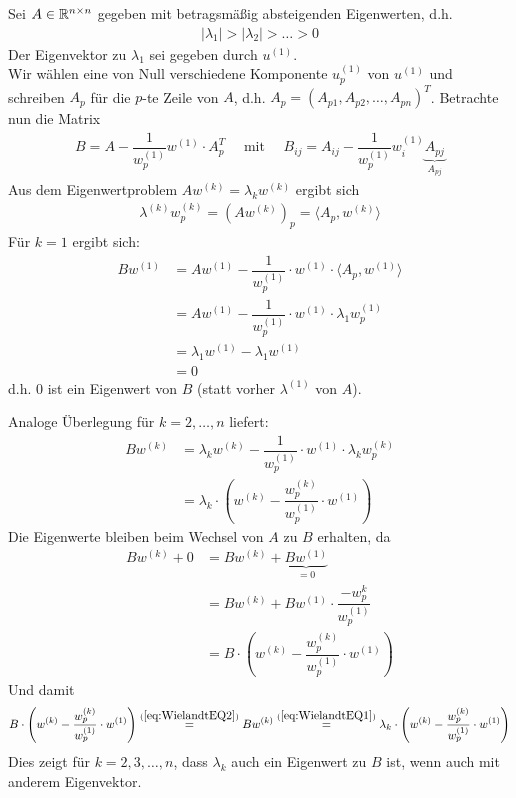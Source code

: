 Sei $A\in\mathbb R^{n\times n}$ gegeben mit betragsmäßig absteigenden Eigenwerten, d.h. 
%
\begin{align*}
  |\lambda_1| > |\lambda_2| > \dots > 0
\end{align*}
%
Der Eigenvektor zu $\lambda_1$ sei gegeben durch $u^{(1)}$. \\
Wir wählen eine von Null verschiedene Komponente $u^{(1)}_p$ von $u^{(1)}$ und schreiben $A_p$ für die $p$-te Zeile
von $A$, d.h. $A_p=(A_{p1},A_{p2},\dots,A_{pn})^T$. Betrachte nun die Matrix 
%
\begin{align*}
  B 
  = A - \dfrac{1}{w_p^{(1)}} w^{(1)}\cdot A_p^T\quad\text{ mit }\quad B_{ij} = 
  A_{ij}-\dfrac{1}{w^{(1)}_p}w^{(1)}_i\underbrace{A_{pj}}_{A_{pj}}
\end{align*}
%
Aus dem Eigenwertproblem $Aw^{(k)} = \lambda_k w^{(k)}$ ergibt sich
%
\begin{align*}
  \lambda^{(k)}w^{(k)}_p = (Aw^{(k)})_p = \langle A_p, w^{(k)}\rangle
\end{align*}
%
Für $k=1$ ergibt sich:
%
\begin{align*}
  Bw^{(1)} 
  &= Aw^{(1)} - \dfrac{1}{w^{(1)}_p} \cdot w^{(1)}\cdot \langle A_p, w^{(1)}\rangle \\
  &= Aw^{(1)} - \dfrac{1}{w^{(1)}_p} \cdot w^{(1)}\cdot \lambda_1 w^{(1)}_p \\
  &= \lambda_1 w^{(1)} - \lambda_1w^{(1)} \\
  &= 0
\end{align*}
%
d.h. $0$ ist ein Eigenwert von $B$  (statt vorher $\lambda^{(1)}$ von $A$).  

Analoge Überlegung für $k=2,\dots,n$ liefert:
%
\begin{align*}
  Bw^{(k)} 
  &= \lambda_k w^{(k)} - \dfrac{1}{w^{(1)}_p} \cdot w^{(1)}\cdot \lambda_kw^{(k)}_p \\
  &= \lambda_k\cdot\left(w^{(k)} - \dfrac{w^{(k)}_p}{w^{(1)}_p} \cdot w^{(1)}\right) 
  \tag{1}\label{eq:WielandtEQ1}
\end{align*}
%
Die Eigenwerte bleiben beim Wechsel von $A$ zu $B$ erhalten, da 
\begin{align*}
  Bw^{(k)} + 0 
  &= Bw^{(k)} + \underbrace{Bw^{(1)}}_{=0} \\
  &= Bw^{(k)} + Bw^{(1)}\cdot\dfrac{-w_p^{k}}{w_p^{(1)}} \\
  &= B\cdot\left(w^{(k)} - \dfrac{w^{(k)}_p}{w^{(1)}_p} \cdot w^{(1)}\right) 
  \tag{2}\label{eq:WielandtEQ2}
\end{align*}
Und damit 
\begin{align*}
  B\cdot\left(w^{(k)} - \dfrac{w^{(k)}_p}{w^{(1)}_p} \cdot w^{(1)}\right) 
   \stackrel{(\ref{eq:WielandtEQ2})}{=} Bw^{(k)} \stackrel{(\ref{eq:WielandtEQ1})}{=}
  \lambda_k\cdot\left(w^{(k)} - \dfrac{w^{(k)}_p}{w^{(1)}_p} \cdot w^{(1)}\right)
\end{align*}
Dies zeigt für $k=2,3,\dots,n$, dass $\lambda_k$ auch ein Eigenwert zu $B$ ist, 
wenn auch mit anderem Eigenvektor. 

